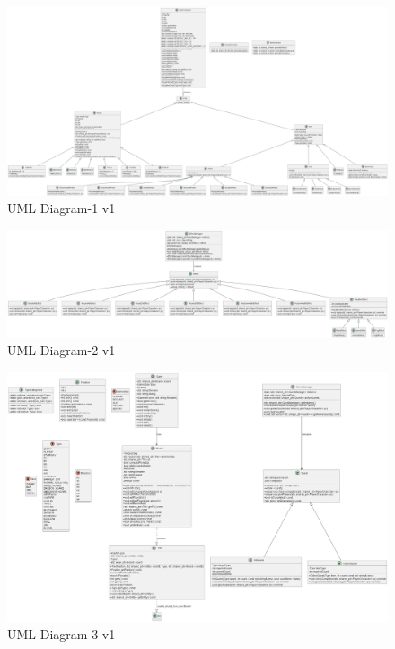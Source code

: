 \documentclass{article}
\begin{document}
\begin{figure}[htbp]
    \centering
    \includegraphics[width=\linewidth]{./out/uml_v1/uml1.png} %
    \caption{UML Diagram-1 v1}
    \label{fig:uml-diagram-1}
\end{figure}
\begin{figure}[htbp]
    \centering
    \includegraphics[width=\linewidth]{./out/uml_v1/uml2.png} %
    \caption{UML Diagram-2 v1}
    \label{fig:uml-diagram-2}
\end{figure}
\begin{figure}[htbp]
    \centering
    \includegraphics[width=\linewidth]{./out/uml_v1/uml3.png} %
    \caption{UML Diagram-3 v1}
    \label{fig:uml-diagram-3}
\end{figure}
\end{document}
